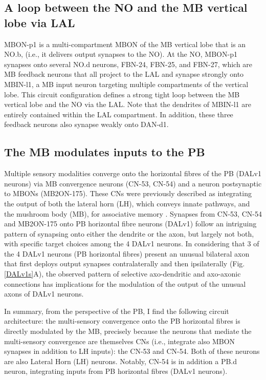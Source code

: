     \subsection{A loop between the NO and the MB vertical lobe via LAL}
    MBON-p1 is a multi-compartment MBON of the MB vertical lobe that is an NO.b, (i.e., it delivers output synapses to the NO).
    At the NO, MBON-p1 synapses onto several NO.d neurons, FBN-24, FBN-25, and FBN-27, which are MB feedback neurons \citep{eschbach2020recurrent} that all project to the LAL and synapse strongly onto MBIN-l1, a MB input neuron targeting multiple compartments of the vertical lobe.
    This circuit configuration defines a strong tight loop between the MB vertical lobe and the NO via the LAL.  Note that the dendrites of MBIN-l1 are entirely contained within the LAL compartment.
    In addition, these three feedback neurons also synapse weakly onto DAN-d1.

    \subsection{The MB modulates inputs to the PB}
    Multiple sensory modalities converge onto the horizontal fibres of the PB (DALv1 neurons) via MB convergence neurons (CN-53, CN-54) and a neuron postsynaptic to MBONs (MB2ON-175).
    These CNs were previously described as integrating the output of both the lateral horn (LH), which conveys innate pathways, and the mushroom body (MB), for associative memory \citep{eschbach2021circuits}.
    Synapses from CN-53, CN-54 and MB2ON-175 onto PB horizontal fibre neurons (DALv1) follow an intriguing pattern of synapsing onto either the dendrite or the axon, but largely not both, with specific target choices among the 4 DALv1 neurons.
    In considering that 3 of the 4 DALv1 neurons (PB horizontal fibres) present an unusual bilateral axon that first deploys output synapses contralaterally and then ipsilaterally (Fig. \ref{DALv1s}A), the observed pattern of selective axo-dendritic and axo-axonic connections has implications for the modulation of the output of the unusual axons of DALv1 neurons.

    In summary, from the perspective of the PB, I find the following circuit architecture: the multi-sensory convergence onto the PB horizontal fibres is directly modulated by the MB, precisely because the neurons that mediate the multi-sensory convergence are themselves CNs (i.e., integrate also MBON synapses in addition to LH inputs): the CN-53 and CN-54. Both of these neurons are also Lateral Horn (LH) neurons.  Notably, CN-54 is in addition a PB.d neuron, integrating inputs from PB horizontal fibres (DALv1 neurons).


